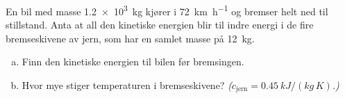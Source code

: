 %
En bil med masse \SI{1.2e3}{\kilo\gram} kjører i \SI{72}{\kilo\metre\per\hour} og bremser helt ned til stillstand. Anta at all den kinetiske energien blir til indre energi i de fire bremseskivene av jern, som har en samlet masse på \SI{12}{\kilo\gram}.
\begin{enumerate}[a)]
    \item Finn den kinetiske energien til bilen før bremsingen.
    \item Hvor mye stiger temperaturen i bremseskivene? \textit{($c_\text{jern} = \SI{0.45}{kJ/(kg\,K)}$.)}
\end{enumerate}
%
